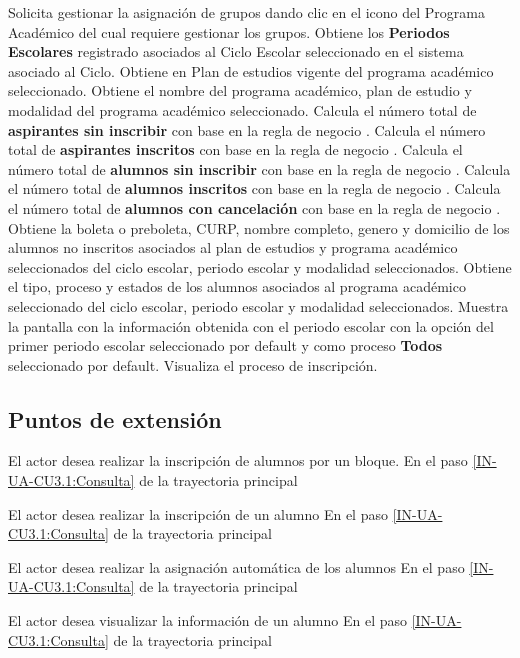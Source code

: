 \begin{UCtrayectoria}
	\UCpaso[\UCactor] Solicita gestionar la asignación de grupos dando clic en el icono \IUVer{} del Programa Académico del cual requiere gestionar los grupos.
	\UCpaso Obtiene los \textbf{Periodos Escolares} registrado asociados al Ciclo Escolar seleccionado en el sistema asociado al Ciclo. 
	\UCpaso Obtiene en Plan de estudios vigente del programa académico  seleccionado. 
	\UCpaso Obtiene el nombre del programa académico, plan de estudio y modalidad del programa académico seleccionado.
	\UCpaso Calcula el número total de \textbf{aspirantes sin inscribir} con base en la regla de negocio .		
	\UCpaso Calcula el número total de \textbf{aspirantes inscritos} con base en la regla de negocio .		
	\UCpaso Calcula el número total de \textbf{alumnos sin inscribir} con base en la regla de negocio .		
	\UCpaso Calcula el número total de \textbf{alumnos inscritos} con base en la regla de negocio .
	\UCpaso Calcula el número total de \textbf{alumnos con cancelación} con base en la regla de negocio .
	\UCpaso Obtiene la boleta o preboleta, CURP, nombre completo, genero y domicilio de los alumnos no inscritos asociados al plan de estudios y programa académico seleccionados del ciclo escolar, periodo escolar y modalidad seleccionados.
	\UCpaso Obtiene el tipo, proceso y estados de los alumnos asociados al programa académico seleccionado del ciclo escolar, periodo escolar y modalidad seleccionados.
	\UCpaso Muestra la pantalla  con la información obtenida con el periodo escolar con la opción del primer periodo escolar seleccionado por default y como proceso \textbf{Todos} seleccionado por default.
	\UCpaso[\UCactor] \label{IN-UA-CU3.1:Consulta} Visualiza el proceso de inscripción.
\end{UCtrayectoria}

\subsection{Puntos de extensión}

{El actor desea realizar la inscripción de alumnos por un bloque.}
{En el paso \ref{IN-UA-CU3.1:Consulta} de la trayectoria principal}
{}

{El actor desea realizar la inscripción de un alumno}
{En el paso \ref{IN-UA-CU3.1:Consulta} de la trayectoria principal}
{}

{El actor desea realizar la asignación automática de los alumnos}
{En el paso \ref{IN-UA-CU3.1:Consulta} de la trayectoria principal}
{}

{El actor desea visualizar la información de un alumno}
{En el paso \ref{IN-UA-CU3.1:Consulta} de la trayectoria principal}
{}